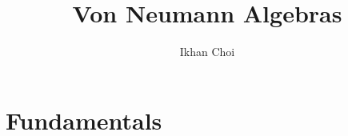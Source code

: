 \documentclass{../../large}
\begin{document}
\title{Von Neumann Algebras}
\author{Ikhan Choi}
\maketitle
\tableofcontents

\iffalse
injectivity
Connes embeddability
property Gamma
Connes' bicentralizer problem
Shlyakhtenko semicircular system
group stability
bimodule

\fi


\part{Fundamentals}


\chapter{}

\section{}
\end{document}
